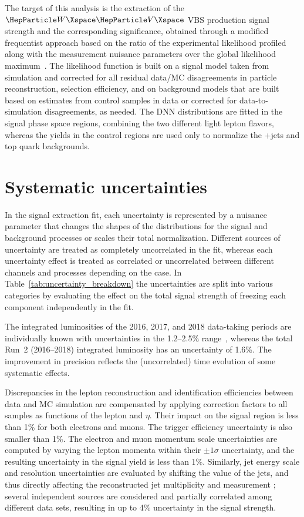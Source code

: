 The target of this analysis is the extraction of the $\PW\PV$ VBS production signal strength and the corresponding
significance, obtained through a modified frequentist approach based on the ratio of the experimental likelihood
profiled along with the measurement nuisance parameters over the global likelihood maximum~\cite{Cowan:2010js}.
The likelihood function is built on a signal model taken from simulation and corrected for all residual data/MC
disagreements in particle reconstruction, selection efficiency, and on background models that are built based on
estimates from control samples in data or corrected for data-to-simulation disagreements, as needed.  The DNN
distributions are fitted in the signal phase space regions, combining the two different light lepton flavors, whereas
the yields in the control regions are used only to normalize the {\PW}+jets and top quark backgrounds.


\section{Systematic uncertainties}\label{sec:7}

In the signal extraction fit, each uncertainty is represented by a nuisance parameter that changes the shapes of the
distributions for the signal and background processes or scales their total normalization.  Different sources of
uncertainty are treated as completely uncorrelated in the fit, whereas each uncertainty effect is treated as correlated
or uncorrelated between different channels and processes depending on the case.
In Table~\ref{tab:uncertainty_breakdown} the uncertainties are split into various categories by evaluating the effect on
the total signal strength of freezing each component independently in the fit.

The integrated luminosities of the 2016, 2017, and 2018 data-taking periods are individually known with uncertainties in
the 1.2--2.5\%
range~\cite{CMS-LUM-17-003,CMS-PAS-LUM-17-004,CMS-PAS-LUM-18-002},
whereas the total Run~2 (2016--2018)
integrated luminosity has an uncertainty of 1.6\%.  The improvement in precision reflects the (uncorrelated) time
evolution of some systematic effects.

Discrepancies in the lepton reconstruction and identification efficiencies between data and MC simulation are
compensated by applying correction factors to all samples as functions of the lepton \pt and $\eta$.  Their impact on
the signal region is less than 1\% for both electrons and muons.  The trigger efficiency uncertainty is also smaller
than 1\%.  The electron and muon momentum scale uncertainties are computed by varying the lepton momenta within their
$\pm 1\sigma$ uncertainty, and the resulting uncertainty in the signal yield is less than 1\%. Similarly, jet energy
scale and resolution uncertainties are evaluated by shifting the \pt value of the jets, and thus directly affecting the
reconstructed jet multiplicity and \ptmiss measurement \cite{Khachatryan:2016kdb}; several independent sources are
considered and partially correlated among different data sets, resulting in up to 4\% uncertainty in the signal
strength.

